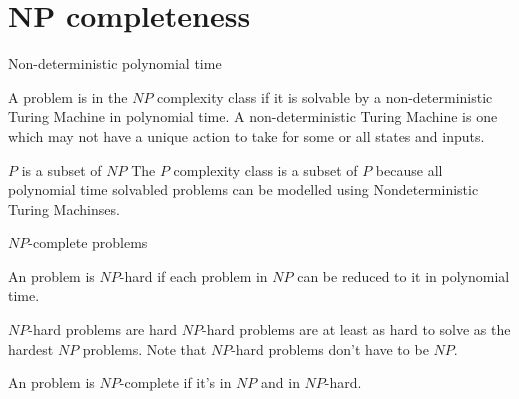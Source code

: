 
\section{NP completeness}


\begin{frame}{Non-deterministic polynomial time}
  \begin{definition}
  A problem is in the $NP$ complexity class if it is solvable by a non-deterministic Turing Machine in polynomial time. A non-deterministic Turing Machine is one which may not have a unique action to take for some or all states and inputs.
  \end{definition}
  
  \vspace{0.5cm}
  \begin{block}{$P$ is a subset of $NP$}
  The $P$ complexity class is a subset of $P$ because all polynomial time solvabled problems can be modelled using Nondeterministic Turing Machinses.
  \end{block}

\end{frame}


\begin{frame}{$NP$-complete problems}
  \begin{definition}
    An problem is $NP$-hard if each problem in $NP$ can be reduced to it in polynomial time.
  \end{definition}
  
  \vspace{0.5cm}
  {
  \begin{block}{$NP$-hard problems are hard}
  $NP$-hard problems are at least as hard to solve as the hardest $NP$ problems.
  Note that $NP$-hard problems don't have to be $NP$.
  \end{block}}
  
  \vspace{0.5cm}
  \begin{definition}
    An problem is $NP$-complete if it's in $NP$ and in $NP$-hard.
  \end{definition}
\end{frame}


